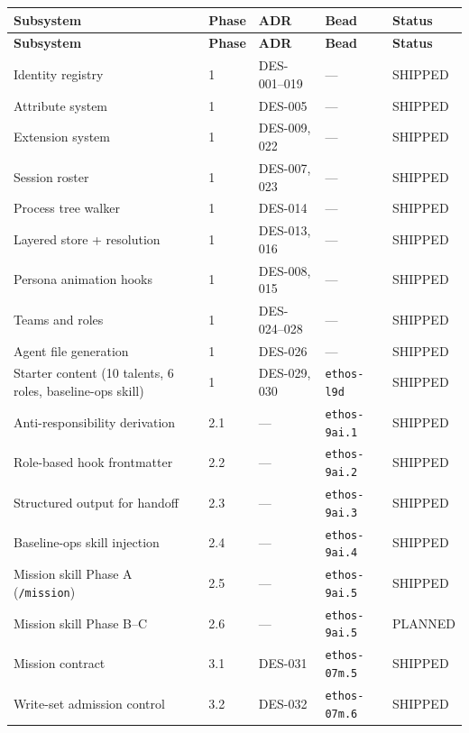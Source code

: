 \documentclass[a4paper,10pt]{article}
\newcommand{\cmd}[1]{\texttt{#1}}
\begin{document}
\begin{center}
\begin{longtable}{@{}lllll@{}}
\toprule
\textbf{Subsystem} & \textbf{Phase} & \textbf{ADR} & \textbf{Bead} &
  \textbf{Status} \\
\midrule
\endfirsthead
\toprule
\textbf{Subsystem} & \textbf{Phase} & \textbf{ADR} & \textbf{Bead} &
  \textbf{Status} \\
\midrule
\endhead
Identity registry              & 1   & DES-001--019 & ---            & SHIPPED \\
Attribute system               & 1   & DES-005      & ---            & SHIPPED \\
Extension system               & 1   & DES-009, 022 & ---            & SHIPPED \\
Session roster                 & 1   & DES-007, 023 & ---            & SHIPPED \\
Process tree walker            & 1   & DES-014      & ---            & SHIPPED \\
Layered store + resolution     & 1   & DES-013, 016 & ---            & SHIPPED \\
Persona animation hooks        & 1   & DES-008, 015 & ---            & SHIPPED \\
Teams and roles                & 1   & DES-024--028 & ---            & SHIPPED \\
Agent file generation          & 1   & DES-026      & ---            & SHIPPED \\
Starter content (10 talents,
  6 roles, baseline-ops skill) & 1   & DES-029, 030 & \texttt{ethos-l9d} & SHIPPED \\
\midrule
Anti-responsibility derivation & 2.1 & --- & \texttt{ethos-9ai.1} & SHIPPED \\
Role-based hook frontmatter    & 2.2 & --- & \texttt{ethos-9ai.2} & SHIPPED \\
Structured output for handoff  & 2.3 & --- & \texttt{ethos-9ai.3} & SHIPPED \\
Baseline-ops skill injection   & 2.4 & --- & \texttt{ethos-9ai.4} & SHIPPED \\
Mission skill Phase A (\cmd{/mission}) & 2.5 & --- & \texttt{ethos-9ai.5} & SHIPPED \\
Mission skill Phase B--C               & 2.6 & --- & \texttt{ethos-9ai.5} & PLANNED \\
\midrule
Mission contract               & 3.1 & DES-031      & \texttt{ethos-07m.5} & SHIPPED \\
Write-set admission control    & 3.2 & DES-032      & \texttt{ethos-07m.6} & SHIPPED \\

\end{longtable}
\end{center}
\end{document}
